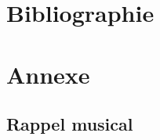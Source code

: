 \documentclass[a4paper, titlepage, oneside, 12pt]{article}%
\begin{document}
\newpage
\section{Bibliographie}
\nocite{*}



\newpage\section{Annexe}
\subsection{Rappel musical}
\end{document}
